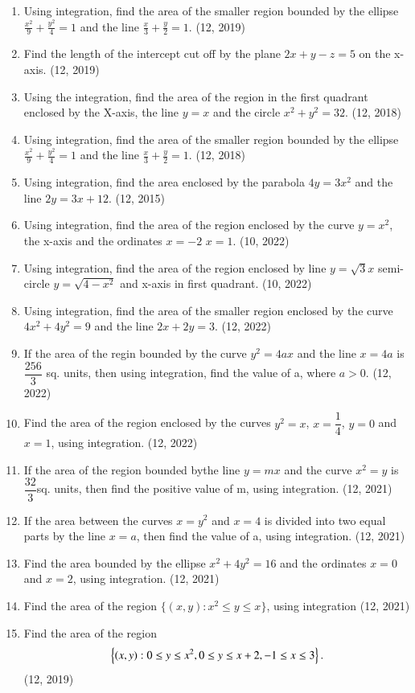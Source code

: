 \begin{enumerate}[label=\thesubsection.\arabic*,ref=\thesubsection.\theenumi]
\item Using integration, find the area of the smaller region bounded by the ellipse $\frac{x^{2}}{9}+\frac{y^{2}}{4}=1$ and the line $\frac{x}{3}+\frac{y}{2}=1$. \hfill (12, 2019)
\item Find the length of the intercept cut off by the plane $2x+y-z=5$ on the x-axis. \hfill (12, 2019)
\item Using the integration, find the area of the region in the first quadrant enclosed by the X-axis, the line $y=x$ and the circle $x^{2}+y^{2}=32$. \hfill (12, 2018)
\item Using integration, find the area of the smaller region bounded by the ellipse $\frac{x^{2}}{9}+\frac{y^{2}}{4}=1$ and the line $\frac{x}{3}+\frac{y}{2}=1$. \hfill (12, 2018)
\item Using integration, find the area enclosed by the parabola $4y = 3x^2$ and the line $2y = 3x+12$. 
\hfill (12, 2015)
\item Using integration, find the area of the region enclosed by the curve $ y=x^2 $, the x-axis and the ordinates $x=-2$  $x=1$.
\hfill (10, 2022)
\item Using integration, find the area of the region enclosed by line $y=\sqrt{3}x$ semi-circle $y=\sqrt{4-x^2}$ and x-axis in first quadrant.
\hfill (10, 2022)
\item Using integration, find the area of the smaller region enclosed by the curve ${4x^2 + 4y^2} = 9$ and the line $2x + 2y =3$.
\hfill (12, 2022)
\item If the area of the regin bounded by the curve $y^2 = 4ax$ and the line $x = 4a$ is $\dfrac{256}{3}$\hspace{0.2cm} sq. units, then using integration, find the value of a, where $a>0$.
\hfill (12, 2022)
\item Find the area of the region enclosed by the curves $y^2=x$, $x=\dfrac{1}{4}$,  $y=0$ and $x=1$, using integration.
\hfill (12, 2022)
\item If the area of the region bounded bythe line $y=mx$ and the curve $x^2=y$ is $\dfrac{32}{3}$\hspace{0.2cm}sq. units, then find the positive value of m, using integration.
\hfill (12, 2021)
\item If the area between the curves $x = y^2$ and $x = 4$ is divided into two equal parts by the line $x = a$, then find the value of a, using integration.
\hfill (12, 2021)

\item Find the area bounded by the ellipse $x^2+4y^2=16$ and the ordinates $x=0$ and $x=2$, using integration.
\hfill (12, 2021)

\item Find the area of the region $\{(x,y) : x^2 \leq y \leq x\}$, using integration
\hfill (12, 2021)
\item Find the area of the region 
\begin{align*}
    \left\{(x,y):0\leq y \leq x^{2},0 \leq y \leq x +2 , -1 \leq x \leq 3\right\}.
\end{align*}
\hfill (12, 2019)
\end{enumerate}
